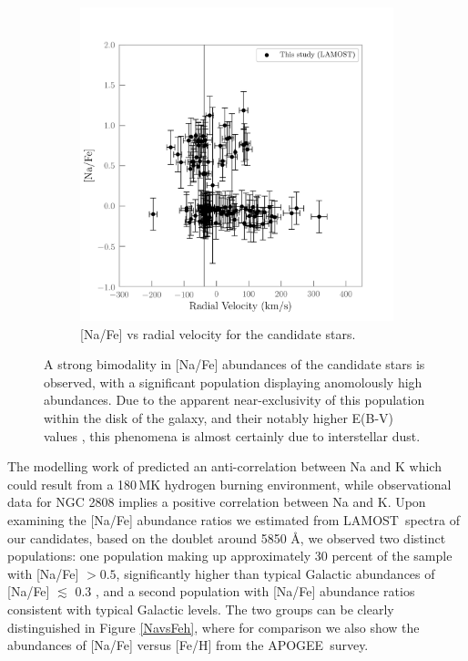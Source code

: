 \documentclass[a4paper,fleqn,usenatbib]{mnras}
\newcommand{\project}[1]{#1}
\newcommand{\lamost}{\project{LAMOST}}
\newcommand{\apogee}{\project{APOGEE}}
\begin{document}
\begin{figure}
\begin{subfigure}{0.35\textwidth}
\centering
	\includegraphics[width=\columnwidth]{Navsradvel.png}
    \caption{[Na/Fe] vs radial velocity for the candidate stars.}
    \label{Navsradvel}
\end{subfigure}

\caption{A strong bimodality in [Na/Fe] abundances of the candidate stars is observed, with a significant population displaying anomolously high abundances. Due to the apparent near-exclusivity of this population within the disk of the galaxy, and their notably higher E(B-V) values \citep{schlafly2011}, this phenomena is almost certainly due to interstellar dust.}
\end{figure}


The modelling work of \cite{prantzos2017} predicted an anti-correlation between Na and K which could result from a 180\,MK hydrogen burning environment, while observational data for NGC 2808 implies a positive correlation between Na and K. Upon examining the [Na/Fe] abundance ratios we estimated from \lamost\ spectra of our candidates, based on the doublet around 5850 \AA, we observed two distinct populations: one population making up approximately 30 percent of the sample with [Na/Fe] $> 0.5$, significantly higher than typical Galactic abundances of [Na/Fe] $\lesssim$ 0.3 \citep{kobayashi2011}, and a second population with [Na/Fe] abundance ratios consistent with typical Galactic levels. The two groups can be clearly distinguished in Figure \ref{NavsFeh}, where for comparison we also show the abundances of [Na/Fe] versus [Fe/H] from the \apogee\ survey.
\end{document}
